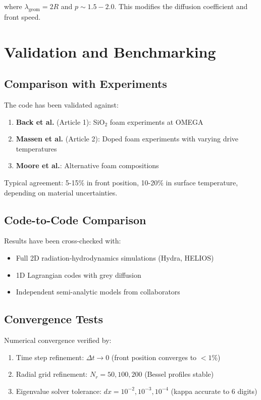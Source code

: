 \documentclass[12pt,a4paper]{article}
\begin{document}
where $\lambda_{\text{geom}} = 2R$ and $p \sim 1.5-2.0$. This modifies the diffusion coefficient and front speed.

\section{Validation and Benchmarking}

\subsection{Comparison with Experiments}

The code has been validated against:
\begin{enumerate}
    \item \textbf{Back et al.} (Article 1): SiO$_2$ foam experiments at OMEGA
    \item \textbf{Massen et al.} (Article 2): Doped foam experiments with varying drive temperatures
    \item \textbf{Moore et al.}: Alternative foam compositions
\end{enumerate}

Typical agreement: 5-15\% in front position, 10-20\% in surface temperature, depending on material uncertainties.

\subsection{Code-to-Code Comparison}

Results have been cross-checked with:
\begin{itemize}
    \item Full 2D radiation-hydrodynamics simulations (Hydra, HELIOS)
    \item 1D Lagrangian codes with grey diffusion
    \item Independent semi-analytic models from collaborators
\end{itemize}

\subsection{Convergence Tests}

Numerical convergence verified by:
\begin{enumerate}
    \item Time step refinement: $\Delta t \to 0$ (front position converges to $<1\%$)
    \item Radial grid refinement: $N_r = 50, 100, 200$ (Bessel profiles stable)
    \item Eigenvalue solver tolerance: $dx = 10^{-2}, 10^{-3}, 10^{-4}$ (kappa accurate to 6 digits)
\end{enumerate}
\end{document}
